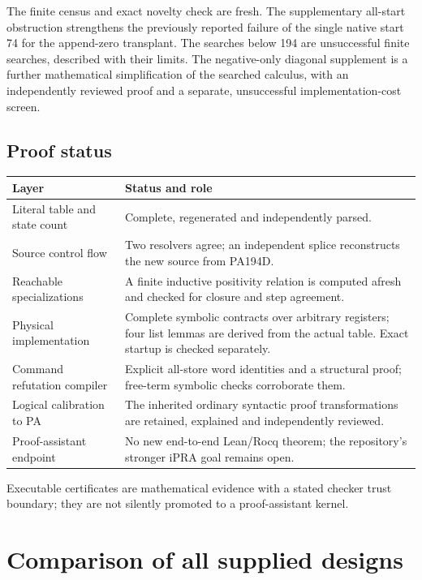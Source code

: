 \documentclass[11pt,letterpaper]{article}
\begin{document}
The finite census and exact novelty check are fresh. The supplementary
all-start obstruction strengthens the previously reported failure of the
single native start 74 for the append-zero transplant. The searches below
194 are unsuccessful finite searches, described with their limits. The
negative-only diagonal supplement is a further mathematical simplification
of the searched calculus, with an independently reviewed proof and a
separate, unsuccessful implementation-cost screen.

\subsection{Proof status}

\begin{center}
\begin{tabularx}{\linewidth}{@{}p{.29\linewidth}X@{}}\toprule
Layer & Status and role\\\midrule
Literal table and state count & Complete, regenerated and independently parsed.\\
Source control flow & Two resolvers agree; an independent splice reconstructs the new source from PA194D.\\
Reachable specializations & A finite inductive positivity relation is computed afresh and checked for closure and step agreement.\\
Physical implementation & Complete symbolic contracts over arbitrary registers; four list lemmas are derived from the actual table. Exact startup is checked separately.\\
Command refutation compiler & Explicit all-store word identities and a structural proof; free-term symbolic checks corroborate them.\\
Logical calibration to PA & The inherited ordinary syntactic proof transformations are retained, explained and independently reviewed.\\
Proof-assistant endpoint & No new end-to-end Lean/Rocq theorem; the repository's stronger iPRA goal remains open.\\\bottomrule
\end{tabularx}
\end{center}
Executable certificates are mathematical evidence with a stated checker
trust boundary; they are not silently promoted to a proof-assistant kernel.

\section{Comparison of all supplied designs}
\label{sec:comparison}
\end{document}
